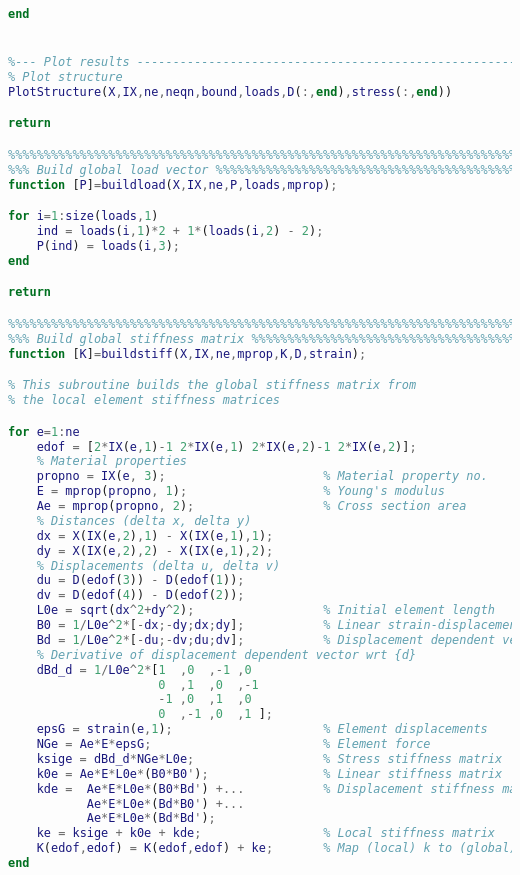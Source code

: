 \begin{lstlisting}[language=Matlab, caption = FE implementation for geometrical non-linearity, label=lst:CodeGNA]
end


%--- Plot results --------------------------------------------------------%
% Plot structure
PlotStructure(X,IX,ne,neqn,bound,loads,D(:,end),stress(:,end)) 

return

%%%%%%%%%%%%%%%%%%%%%%%%%%%%%%%%%%%%%%%%%%%%%%%%%%%%%%%%%%%%%%%%%%%%%%%%%%%
%%% Build global load vector %%%%%%%%%%%%%%%%%%%%%%%%%%%%%%%%%%%%%%%%%%%%%%
function [P]=buildload(X,IX,ne,P,loads,mprop);

for i=1:size(loads,1)
    ind = loads(i,1)*2 + 1*(loads(i,2) - 2);
    P(ind) = loads(i,3);
end

return

%%%%%%%%%%%%%%%%%%%%%%%%%%%%%%%%%%%%%%%%%%%%%%%%%%%%%%%%%%%%%%%%%%%%%%%%%%%
%%% Build global stiffness matrix %%%%%%%%%%%%%%%%%%%%%%%%%%%%%%%%%%%%%%%%%
function [K]=buildstiff(X,IX,ne,mprop,K,D,strain);

% This subroutine builds the global stiffness matrix from
% the local element stiffness matrices

for e=1:ne
    edof = [2*IX(e,1)-1 2*IX(e,1) 2*IX(e,2)-1 2*IX(e,2)];
    % Material properties
    propno = IX(e, 3);                      % Material property no.
    E = mprop(propno, 1);                   % Young's modulus
    Ae = mprop(propno, 2);                  % Cross section area
    % Distances (delta x, delta y)
    dx = X(IX(e,2),1) - X(IX(e,1),1);
    dy = X(IX(e,2),2) - X(IX(e,1),2);
    % Displacements (delta u, delta v)
    du = D(edof(3)) - D(edof(1));
    dv = D(edof(4)) - D(edof(2));
    L0e = sqrt(dx^2+dy^2);                  % Initial element length
    B0 = 1/L0e^2*[-dx;-dy;dx;dy];           % Linear strain-displacement v.
    Bd = 1/L0e^2*[-du;-dv;du;dv];           % Displacement dependent vector
    % Derivative of displacement dependent vector wrt {d}
    dBd_d = 1/L0e^2*[1  ,0  ,-1 ,0
                     0  ,1  ,0  ,-1
                     -1 ,0  ,1  ,0
                     0  ,-1 ,0  ,1 ];
    epsG = strain(e,1);                     % Element displacements
    NGe = Ae*E*epsG;                        % Element force
    ksige = dBd_d*NGe*L0e;                  % Stress stiffness matrix
    k0e = Ae*E*L0e*(B0*B0');                % Linear stiffness matrix
    kde =  Ae*E*L0e*(B0*Bd') +...           % Displacement stiffness matrix
           Ae*E*L0e*(Bd*B0') +...
           Ae*E*L0e*(Bd*Bd');
    ke = ksige + k0e + kde;                 % Local stiffness matrix
    K(edof,edof) = K(edof,edof) + ke;       % Map (local) k to (global) K
end


\end{lstlisting}
